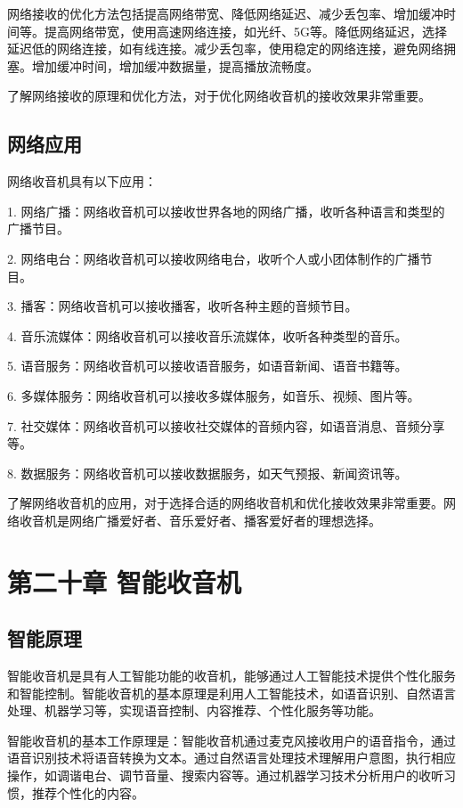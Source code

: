 \documentclass[12pt,UTF8]{ctexbook}
\begin{document}
网络接收的优化方法包括提高网络带宽、降低网络延迟、减少丢包率、增加缓冲时间等。提高网络带宽，使用高速网络连接，如光纤、5G等。降低网络延迟，选择延迟低的网络连接，如有线连接。减少丢包率，使用稳定的网络连接，避免网络拥塞。增加缓冲时间，增加缓冲数据量，提高播放流畅度。

了解网络接收的原理和优化方法，对于优化网络收音机的接收效果非常重要。

\section{网络应用}

网络收音机具有以下应用：

1. 网络广播：网络收音机可以接收世界各地的网络广播，收听各种语言和类型的广播节目。

2. 网络电台：网络收音机可以接收网络电台，收听个人或小团体制作的广播节目。

3. 播客：网络收音机可以接收播客，收听各种主题的音频节目。

4. 音乐流媒体：网络收音机可以接收音乐流媒体，收听各种类型的音乐。

5. 语音服务：网络收音机可以接收语音服务，如语音新闻、语音书籍等。

6. 多媒体服务：网络收音机可以接收多媒体服务，如音乐、视频、图片等。

7. 社交媒体：网络收音机可以接收社交媒体的音频内容，如语音消息、音频分享等。

8. 数据服务：网络收音机可以接收数据服务，如天气预报、新闻资讯等。

了解网络收音机的应用，对于选择合适的网络收音机和优化接收效果非常重要。网络收音机是网络广播爱好者、音乐爱好者、播客爱好者的理想选择。

\chapter{第二十章 智能收音机}

\section{智能原理}

智能收音机是具有人工智能功能的收音机，能够通过人工智能技术提供个性化服务和智能控制。智能收音机的基本原理是利用人工智能技术，如语音识别、自然语言处理、机器学习等，实现语音控制、内容推荐、个性化服务等功能。

智能收音机的基本工作原理是：智能收音机通过麦克风接收用户的语音指令，通过语音识别技术将语音转换为文本。通过自然语言处理技术理解用户意图，执行相应操作，如调谐电台、调节音量、搜索内容等。通过机器学习技术分析用户的收听习惯，推荐个性化的内容。
\end{document}
